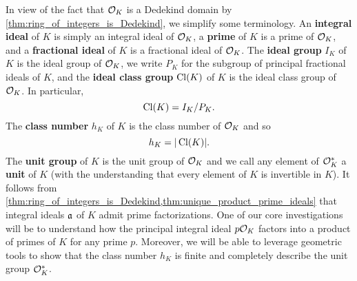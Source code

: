     In view of the fact that $\mathcal{O}_{K}$ is a Dedekind domain by \cref{thm:ring_of_integers_is_Dedekind}, we simplify some terminology. An \textbf{integral ideal} of $K$ is simply an integral ideal of $\mathcal{O}_{K}$, a \textbf{prime} of $K$ is a prime of $\mathcal{O}_{K}$, and a \textbf{fractional ideal} of $K$ is a fractional ideal of $\mathcal{O}_{K}$. The \textbf{ideal group} $I_{K}$ of $K$ is the ideal group of $\mathcal{O}_{K}$, we write $P_{K}$ for the subgroup of principal fractional ideals of $K$, and the \textbf{ideal class group} $\operatorname{\mathrm{Cl}}(K)$ of $K$ is the ideal class group of $\mathcal{O}_{K}$. In particular,
    \[
      \operatorname{\mathrm{Cl}}(K) = I_{K}/P_{K}.
    \]
    The \textbf{class number} $h_{K}$ of $K$ is the class number of $\mathcal{O}_{K}$ and so
    \[
      h_{K} = |\operatorname{\mathrm{Cl}}(K)|.
    \]
    The \textbf{unit group} of $K$ is the unit group of $\mathcal{O}_{K}$ and we call any element of $\mathcal{O}_{K}^{\ast}$ a \textbf{unit} of $K$ (with the understanding that every element of $K$ is invertible in $K$). It follows from \cref{thm:ring_of_integers_is_Dedekind,thm:unique_product_prime_ideals} that integral ideals $\mathfrak{a}$ of $K$ admit prime factorizations. One of our core investigations will be to understand how the principal integral ideal $p\mathcal{O}_{K}$ factors into a product of primes of $K$ for any prime $p$. Moreover, we will be able to leverage geometric tools to show that the class number $h_{K}$ is finite and completely describe the unit group $\mathcal{O}_{K}^{\ast}$.
